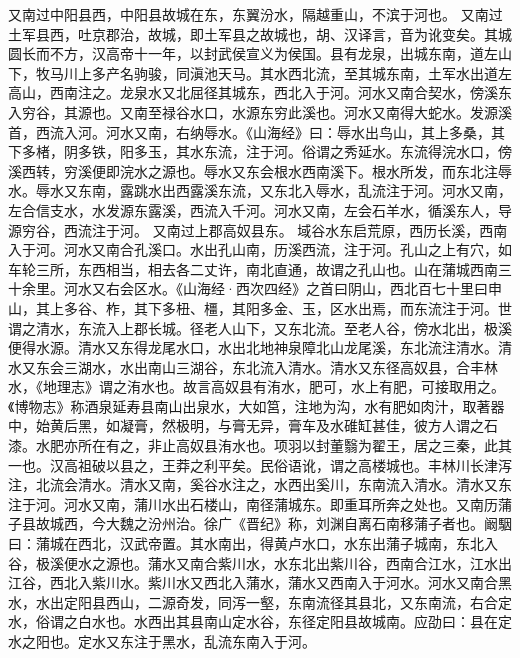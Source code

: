 \documentclass[12pt,UTF8]{ctexbook}
\begin{document}
又南过中阳县西，中阳县故城在东，东翼汾水，隔越重山，不滨于河也。
又南过土军县西，吐京郡治，故城，即土军县之故城也，胡、汉译言，音为讹变矣。其城圆长而不方，汉高帝十一年，以封武侯宣义为侯国。县有龙泉，出城东南，道左山下，牧马川上多产名驹骏，同滇池天马。其水西北流，至其城东南，土军水出道左高山，西南注之。龙泉水又北屈径其城东，西北入于河。河水又南合契水，傍溪东入穷谷，其源也。又南至禄谷水口，水源东穷此溪也。河水又南得大蛇水。发源溪首，西流入河。河水又南，右纳辱水。《山海经》曰：辱水出鸟山，其上多桑，其下多楮，阴多铁，阳多玉，其水东流，注于河。俗谓之秀延水。东流得浣水口，傍溪西转，穷溪便即浣水之源也。辱水又东会根水西南溪下。根水所发，而东北注辱水。辱水又东南，露跳水出西露溪东流，又东北入辱水，乱流注于河。河水又南，左合信支水，水发源东露溪，西流入千河。河水又南，左会石羊水，循溪东人，导源穷谷，西流注于河。
又南过上郡高奴县东。
域谷水东启荒原，西历长溪，西南入于河。河水又南合孔溪口。水出孔山南，历溪西流，注于河。孔山之上有穴，如车轮三所，东西相当，相去各二丈许，南北直通，故谓之孔山也。山在蒲城西南三十余里。河水又右会区水。《山海经·西次四经》之首曰阴山，西北百七十里曰申山，其上多谷、柞，其下多杻、橿，其阳多金、玉，区水出焉，而东流注于河。世谓之清水，东流入上郡长城。径老人山下，又东北流。至老人谷，傍水北出，极溪便得水源。清水又东得龙尾水口，水出北地神泉障北山龙尾溪，东北流注清水。清水又东会三湖水，水出南山三湖谷，东北流入清水。清水又东径高奴县，合丰林水，《地理志》谓之洧水也。故言高奴县有洧水，肥可，水上有肥，可接取用之。《博物志》称酒泉延寿县南山出泉水，大如筥，注地为沟，水有肥如肉汁，取著器中，始黄后黑，如凝膏，然极明，与膏无异，膏车及水碓缸甚佳，彼方人谓之石漆。水肥亦所在有之，非止高奴县洧水也。项羽以封董翳为翟王，居之三秦，此其一也。汉高祖破以县之，王莽之利平矣。民俗语讹，谓之高楼城也。丰林川长津泻注，北流会清水。清水又南，奚谷水注之，水西出奚川，东南流入清水。清水又东注于河。河水又南，蒲川水出石楼山，南径蒲城东。即重耳所奔之处也。又南历蒲子县故城西，今大魏之汾州治。徐广《晋纪》称，刘渊自离石南移蒲子者也。阚駰曰：蒲城在西北，汉武帝置。其水南出，得黄卢水口，水东出蒲子城南，东北入谷，极溪便水之源也。蒲水又南合紫川水，水东北出紫川谷，西南合江水，江水出江谷，西北入紫川水。紫川水又西北入蒲水，蒲水又西南入于河水。河水又南合黑水，水出定阳县西山，二源奇发，同泻一壑，东南流径其县北，又东南流，右合定水，俗谓之白水也。水西出其县南山定水谷，东径定阳县故城南。应劭曰：县在定水之阳也。定水又东注于黑水，乱流东南入于河。
\end{document}

